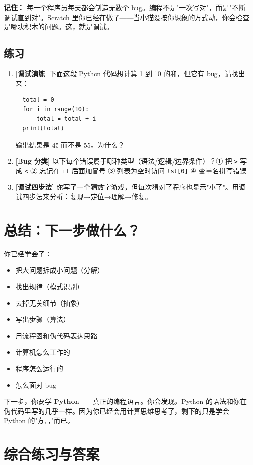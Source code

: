 \documentclass[a4paper,12pt]{ctexart}
\begin{document}
\textbf{记住：} 每一个程序员每天都会制造无数个 bug。编程不是"一次写对"，而是"不断调试直到对"。Scratch 里你已经在做了——当小猫没按你想象的方式动，你会检查是哪块积木的问题。这，就是调试。

\subsection*{练习}

\begin{enumerate}
  \item \textbf{[调试演练]} 下面这段 Python 代码想计算 1 到 10 的和，但它有 bug，请找出来：
  \begin{verbatim}
  total = 0
  for i in range(10):
      total = total + i
  print(total)
  \end{verbatim}
  输出结果是 45 而不是 55。为什么？
  \item \textbf{[Bug 分类]} 以下每个错误属于哪种类型（语法/逻辑/边界条件）？① 把 \texttt{>} 写成 \texttt{<} ② 忘记在 \texttt{if} 后面加冒号 ③ 列表为空时访问 \texttt{lst[0]} ④ 变量名拼写错误
  \item \textbf{[调试四步法]} 你写了一个猜数字游戏，但每次猜对了程序也显示"小了"。用调试四步法来分析：复现→定位→理解→修复。
\end{enumerate}

\section*{总结：下一步做什么？}

你已经学会了：
\begin{itemize}
  \item 把大问题拆成小问题（分解）
  \item 找出规律（模式识别）
  \item 去掉无关细节（抽象）
  \item 写出步骤（算法）
  \item 用流程图和伪代码表达思路
  \item 计算机怎么工作的
  \item 程序怎么运行的
  \item 怎么面对 bug
\end{itemize}

下一步，你要学 \textbf{Python}——真正的编程语言。你会发现，Python 的语法和你在伪代码里写的几乎一样。因为你已经会用计算思维思考了，剩下的只是学会 Python 的"方言"而已。

\section*{综合练习与答案}
\end{document}
